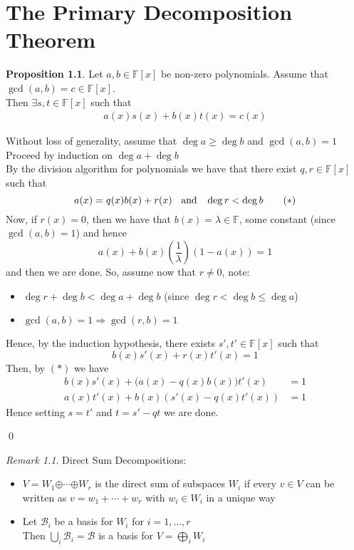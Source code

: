 \documentclass[11pt, a4paper]{report}
\makeatletter
\numberwithin{equation}{section}
\newcommand{\opl}{\boldsymbol{\oplus}}
\newcommand{\F}{\mathbb{F}}
\numberwithin{equation}{subsection}
\theoremstyle{plain}
\theoremstyle{definition}
\newtheorem{prop}[thm]{Proposition}
\theoremstyle{remark}
\newtheorem*{rem}{Remark}
\newtheorem*{prf}{Proof}
\renewenvironment{prf}[1][\proofname]{\par
  \vspace{-\topsep}%
  \normalfont
  \topsep0pt \partopsep0pt %
  \trivlist
  \item[\hskip\labelsep
        \itshape
    #1\@addpunct{.}]\ignorespaces
}{%
  \popQED\endtrivlist\@endpefalse
  \addvspace{6pt plus 6pt} %
}
\newcommand{\pr}[1]{\begin{adjustwidth}{1cm}{} \begin{prf} #1 \end{prf} \end{adjustwidth}}
\makeatother
\begin{document}
\chapter{The Primary Decomposition Theorem}

\begin{prop}
Let $a, b \in \F[x]$ be non-zero polynomials. Assume that $\gcd(a,b) = c \in \F[x]$.\\ Then $\exists s,t \in \F[x]$ such that 
\begin{align*} 
a(x)s(x) + b(x)t(x) = c(x)
\end{align*}

\pr{
Without loss of generality, assume that $\deg a \geq \deg b$ and $\gcd(a,b) = 1$\\
Proceed by induction on $\deg a + \deg b$\\
By the division algorithm for polynomials we have that there exist $q,r \in \F[x]$ such that
$$a(x) = q(x)b(x) + r(x) \text{\;\; and \;\;} \deg r < \deg b  \tag{$*$} $$
Now, if $r(x) = 0$, then we have that $b(x) = \lambda \in \F$, some constant (since $\gcd(a,b) = 1$) and hence
$$a(x) + b(x)\left(\frac{1}{\lambda}\right)(1 - a(x)) = 1$$
and then we are done. So, assume now that $r \neq 0$, note:
\begin{itemize}
\item $\deg r + \deg b < \deg a + \deg b$ \hfill(since $\deg r < \deg b \leq \deg a$)
\item $\gcd(a,b) = 1 \Longrightarrow \gcd(r,b) = 1$
\end{itemize}
Hence, by the induction hypothesis, there exists $s', t' \in \F[x]$ such that
$$b(x)s'(x)+ r(x)t'(x) = 1$$
Then, by $(*)$ we have
\begin{align*}
b(x)s'(x) + \big( a(x) - q(x)b(x) \big) t'(x) &= 1\\
a(x)t'(x) + b(x) \left( s'(x) - q(x) t'(x) \right) &= 1
\end{align*}
Hence setting $s = t'$ and $t = s' - qt$ we are done.
}\qed
\end{prop}

\newpage

\begin{rem} Direct Sum Decompositions:
\begin{itemize}
\item $V = W_1 \opl \cdots \opl W_r$ is the direct sum of subspaces $W_i$ if every $v \in V$ can be written as $v = w_1 + \cdots + w_r$ with $w_i \in W_i$ in a unique way

\item Let $\mathcal{B}_i$ be a basis for $W_i$ for $i = 1, \ldots, r$\\ Then $\bigcup_i \mathcal{B}_i = \mathcal{B}$ is a basis for $V = \bigoplus_i W_i$
\end{itemize}
\end{rem}
\end{document}
